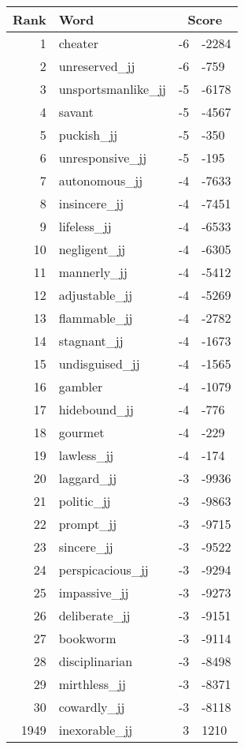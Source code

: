 \begin{longtable}[!htbp]{| rlr@{.}l |}
    \hline
    \textbf{Rank} & \textbf{Word} & \multicolumn{2}{c|}{\textbf{Score}} \\
    \hline
    \endhead
    1 & cheater & -6 & -2284 \\
    2 & unreserved\_jj & -6 & -759 \\
    3 & unsportsmanlike\_jj & -5 & -6178 \\
    4 & savant & -5 & -4567 \\
    5 & puckish\_jj & -5 & -350 \\
    6 & unresponsive\_jj & -5 & -195 \\
    7 & autonomous\_jj & -4 & -7633 \\
    8 & insincere\_jj & -4 & -7451 \\
    9 & lifeless\_jj & -4 & -6533 \\
    10 & negligent\_jj & -4 & -6305 \\
    11 & mannerly\_jj & -4 & -5412 \\
    12 & adjustable\_jj & -4 & -5269 \\
    13 & flammable\_jj & -4 & -2782 \\
    14 & stagnant\_jj & -4 & -1673 \\
    15 & undisguised\_jj & -4 & -1565 \\
    16 & gambler & -4 & -1079 \\
    17 & hidebound\_jj & -4 & -776 \\
    18 & gourmet & -4 & -229 \\
    19 & lawless\_jj & -4 & -174 \\
    20 & laggard\_jj & -3 & -9936 \\
    21 & politic\_jj & -3 & -9863 \\
    22 & prompt\_jj & -3 & -9715 \\
    23 & sincere\_jj & -3 & -9522 \\
    24 & perspicacious\_jj & -3 & -9294 \\
    25 & impassive\_jj & -3 & -9273 \\
    26 & deliberate\_jj & -3 & -9151 \\
    27 & bookworm & -3 & -9114 \\
    28 & disciplinarian & -3 & -8498 \\
    29 & mirthless\_jj & -3 & -8371 \\
    30 & cowardly\_jj & -3 & -8118 \\
    1949 & inexorable\_jj & 3 & 1210 \\

\end{longtable}
